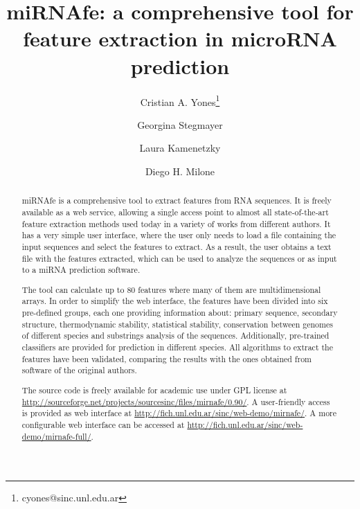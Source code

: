 \documentclass{article}
\begin{document}
\title{miRNAfe: a comprehensive tool for feature extraction in microRNA prediction}
\date{}
\author[1]{Cristian A. Yones\thanks{cyones@sinc.unl.edu.ar}}
\author[1]{Georgina Stegmayer}
\author[2]{Laura Kamenetzky}
\author[1]{Diego H. Milone}

\maketitle

\begin{abstract}
miRNAfe is a comprehensive tool to extract features from RNA sequences. It is freely available as a web service, allowing a single access point to almost all 
state-of-the-art feature extraction methods used today in a variety of works from different authors. It has a very simple user interface, where the user only 
needs to load a file containing the input sequences and select the features to extract. As a result, the user obtains a text file with the features extracted, 
which can be used to analyze the sequences or as input to a miRNA prediction software.

The tool can calculate up to 80 features where many of them are multidimensional arrays. In order to simplify the web interface, the features have been divided 
into six pre-defined groups, each one providing information about: primary sequence, secondary structure, thermodynamic stability, statistical stability, 
conservation between genomes of different species and  substrings analysis of the sequences. Additionally, pre-trained classifiers are provided for prediction 
in different species. All algorithms to extract the features have been validated, comparing the results with the ones obtained from software of the original 
authors.

The source code is freely available for academic use under GPL license at \url{http://sourceforge.net/projects/sourcesinc/files/mirnafe/0.90/}. A user-friendly 
access is provided as web interface at \url{http://fich.unl.edu.ar/sinc/web-demo/mirnafe/}. A more configurable web interface can be accessed at 
\url{http://fich.unl.edu.ar/sinc/web-demo/mirnafe-full/}.
\end{abstract}
\end{document}
